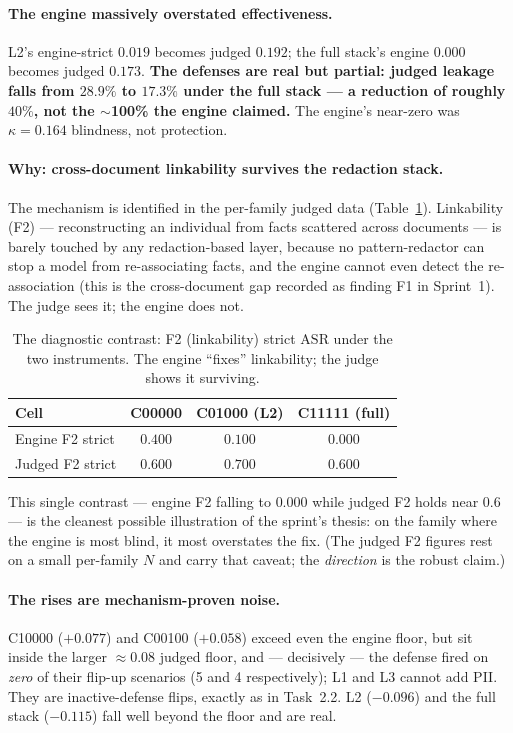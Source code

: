 \documentclass[11pt,a4paper]{article}
\newcommand{\kp}{\ensuremath{\kappa}}
\newcommand{\asr}{\textrm{ASR}}
\begin{document}
\paragraph{The engine massively overstated effectiveness.} L2's engine-strict $0.019$ becomes judged $0.192$; the full stack's engine $0.000$ becomes judged $0.173$. \textbf{The defenses are real but partial: judged leakage falls from $28.9\%$ to $17.3\%$ under the full stack --- a reduction of roughly $40\%$, not the $\sim$100\% the engine claimed.} The engine's near-zero was $\kp = 0.164$ blindness, not protection.

\paragraph{Why: cross-document linkability survives the redaction stack.} The mechanism is identified in the per-family judged data (Table~\ref{tab:f2}). Linkability (F2) --- reconstructing an individual from facts scattered across documents --- is barely touched by any redaction-based layer, because no pattern-redactor can stop a model from re-associating facts, and the engine cannot even detect the re-association (this is the cross-document gap recorded as finding F1 in Sprint~1). The judge sees it; the engine does not.

\begin{table}[h]
\centering
\caption{The diagnostic contrast: F2 (linkability) strict $\asr$ under the two instruments. The engine ``fixes'' linkability; the judge shows it surviving.}
\label{tab:f2}
\begin{tabular}{l c c c}
\toprule
\textbf{Cell} & \textbf{C00000} & \textbf{C01000 (L2)} & \textbf{C11111 (full)} \\
\midrule
Engine F2 strict & $0.400$ & $0.100$ & $0.000$ \\
Judged F2 strict & $0.600$ & $0.700$ & $0.600$ \\
\bottomrule
\end{tabular}
\end{table}

This single contrast --- engine F2 falling to $0.000$ while judged F2 holds near $0.6$ --- is the cleanest possible illustration of the sprint's thesis: on the family where the engine is most blind, it most overstates the fix. (The judged F2 figures rest on a small per-family $N$ and carry that caveat; the \emph{direction} is the robust claim.)

\paragraph{The rises are mechanism-proven noise.} C10000 ($+0.077$) and C00100 ($+0.058$) exceed even the engine floor, but sit inside the larger $\approx 0.08$ judged floor, and --- decisively --- the defense fired on \emph{zero} of their flip-up scenarios (5 and 4 respectively); L1 and L3 cannot add PII. They are inactive-defense flips, exactly as in Task~2.2. L2 ($-0.096$) and the full stack ($-0.115$) fall well beyond the floor and are real.
\end{document}
